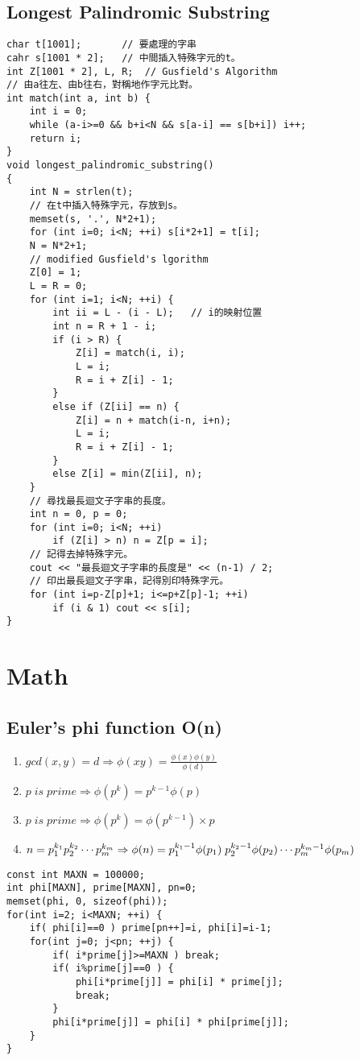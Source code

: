 \documentclass[11pt,twocolumn,a4paper]{article}
\begin{document}
\subsection{Longest Palindromic Substring}
\begin{lstlisting}[label=Longest Palindromic Substring]
char t[1001];		// 要處理的字串
cahr s[1001 * 2];	// 中間插入特殊字元的t。
int Z[1001 * 2], L, R;	// Gusfield's Algorithm
// 由a往左、由b往右，對稱地作字元比對。
int match(int a, int b) {
	int i = 0;
	while (a-i>=0 && b+i<N && s[a-i] == s[b+i]) i++;
	return i;
}
void longest_palindromic_substring()
{
	int N = strlen(t);
	// 在t中插入特殊字元，存放到s。
	memset(s, '.', N*2+1);
	for (int i=0; i<N; ++i) s[i*2+1] = t[i];
	N = N*2+1;
	// modified Gusfield's lgorithm
	Z[0] = 1;
	L = R = 0;
	for (int i=1; i<N; ++i) {
		int ii = L - (i - L);   // i的映射位置
		int n = R + 1 - i;
		if (i > R) {
			Z[i] = match(i, i);
			L = i;
			R = i + Z[i] - 1;
		}
		else if (Z[ii] == n) {
			Z[i] = n + match(i-n, i+n);
			L = i;
			R = i + Z[i] - 1;
		}
		else Z[i] = min(Z[ii], n);
	}
	// 尋找最長迴文子字串的長度。
	int n = 0, p = 0;
	for (int i=0; i<N; ++i)
		if (Z[i] > n) n = Z[p = i];
	// 記得去掉特殊字元。
	cout << "最長迴文子字串的長度是" << (n-1) / 2;
	// 印出最長迴文子字串，記得別印特殊字元。
	for (int i=p-Z[p]+1; i<=p+Z[p]-1; ++i)
		if (i & 1) cout << s[i];
}
\end{lstlisting}

\newpage
\section{Math}
\subsection{Euler's phi function O(n)}
\begin{enumerate}[1.]
\item $gcd(x,y)=d \Rightarrow \phi(xy) = \frac{\phi(x) \phi(y)}{\phi(d)}$
\item $p\; is\; prime \Rightarrow \phi(p^k) = p^{k-1} \phi(p)$
\item $p\; is\; prime \Rightarrow \phi(p^k) = \phi(p^{k-1}) \times p$
\item $n = p_{1}^{k_1} p_{2}^{k_2} \cdots p_{m}^{k_m}\\
\Rightarrow \phi(n) = p_{1}^{k_1-1}\phi(p_1)\; p_{2}^{k_2-1}\phi(p_2) \cdots p_{m}^{k_m-1}\phi(p_m)$
\end{enumerate}

\begin{lstlisting}[label=Euler's phi function O(n)]
const int MAXN = 100000;
int phi[MAXN], prime[MAXN], pn=0;
memset(phi, 0, sizeof(phi));
for(int i=2; i<MAXN; ++i) {
	if( phi[i]==0 ) prime[pn++]=i, phi[i]=i-1;
	for(int j=0; j<pn; ++j) {
		if( i*prime[j]>=MAXN ) break;
		if( i%prime[j]==0 ) {
			phi[i*prime[j]] = phi[i] * prime[j];
			break;
		}
		phi[i*prime[j]] = phi[i] * phi[prime[j]];
	}
}
\end{lstlisting}
\end{document}
